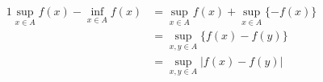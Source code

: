 \documentclass[uplatex]{jsarticle}
\makeatletter
\renewenvironment{proof}[1][\proofname]{\par
        \pushQED{\qed}
        \normalfont
        \topsep6\p@\@plus6\p@ \trivlist
        \item[\hskip\labelsep{\bfseries #1}\@addpunct{\bfseries}]\ignorespaces
    }{%
        \popQED\endtrivlist\@endpefalse
    }
\renewcommand{\proofname}{\underline{証明.}}
\makeatother
\begin{document}
\begin{proof}
    \begin{alignat}{1}
        \sup_{x \in A} f(x) - \inf_{x \in A} f(x)
            &= \sup_{x \in A} f(x) + \sup_{x \in A} \{-f(x)\} \\
            &= \sup_{x,y \in A} \{f(x) - f(y)\} \\
            &= \sup_{x,y \in A} |f(x) - f(y)|
    \end{alignat}
\end{proof}
\end{document}
